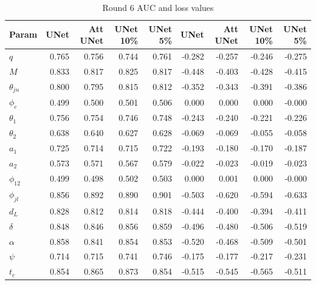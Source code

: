 \begin{table}
\caption{Round 6 AUC and loss values}
\hspace*{-2cm}
\begin{tabular}{lrrrrrrrr}
\toprule
Param & 
\multicolumn{1}{p{0.3cm}}{\raggedright UNet}  & 
\multicolumn{1}{p{0.3cm}}{\raggedleft Att UNet}  &
\multicolumn{1}{p{0.3cm}}{\raggedleft UNet 10\%}  &
\multicolumn{1}{p{0.3cm}}{\raggedleft UNet 5\%}  &
\multicolumn{1}{p{0.3cm}}{\raggedright UNet}  & 
\multicolumn{1}{p{0.3cm}}{\raggedleft Att UNet}  &
\multicolumn{1}{p{0.3cm}}{\raggedleft UNet 10\%}  &
\multicolumn{1}{p{0.3cm}}{\raggedleft UNet 5\%}  \\
\midrule
\( q \) & 0.765 & 0.756 & 0.744 & 0.761 & -0.282 & -0.257 & -0.246 & -0.275 \\
\( M \) & 0.833 & 0.817 & 0.825 & 0.817 & -0.448 & -0.403 & -0.428 & -0.415 \\
\( \theta_{jn} \) & 0.800 & 0.795 & 0.815 & 0.812 & -0.352 & -0.343 & -0.391 & -0.386 \\
\( \phi_c \) & 0.499 & 0.500 & 0.501 & 0.506 & 0.000 & 0.000 & 0.000 & -0.000 \\
\( \theta_1 \) & 0.756 & 0.754 & 0.746 & 0.748 & -0.243 & -0.240 & -0.221 & -0.226 \\
\( \theta_2 \) & 0.638 & 0.640 & 0.627 & 0.628 & -0.069 & -0.069 & -0.055 & -0.058 \\
\( a_1 \) & 0.725 & 0.714 & 0.715 & 0.722 & -0.193 & -0.180 & -0.170 & -0.187 \\
\( a_2 \) & 0.573 & 0.571 & 0.567 & 0.579 & -0.022 & -0.023 & -0.019 & -0.023 \\
\( \phi_{12} \) & 0.499 & 0.498 & 0.502 & 0.503 & 0.000 & 0.001 & 0.000 & -0.000 \\
\( \phi_{jl} \) & 0.856 & 0.892 & 0.890 & 0.901 & -0.503 & -0.620 & -0.594 & -0.633 \\
\( d_L \) & 0.828 & 0.812 & 0.814 & 0.818 & -0.444 & -0.400 & -0.394 & -0.411 \\
\( \delta \) & 0.848 & 0.846 & 0.856 & 0.859 & -0.496 & -0.480 & -0.506 & -0.519 \\
\( \alpha \) & 0.858 & 0.841 & 0.854 & 0.853 & -0.520 & -0.468 & -0.509 & -0.501 \\
\( \psi \) & 0.714 & 0.715 & 0.741 & 0.746 & -0.175 & -0.177 & -0.217 & -0.231 \\
\( t_c \) & 0.854 & 0.865 & 0.873 & 0.854 & -0.515 & -0.545 & -0.565 & -0.511 \\

\bottomrule
\end{tabular}
\end{table}

